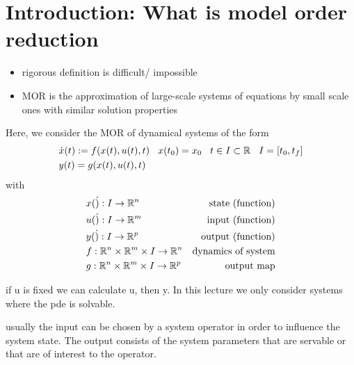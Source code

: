 
\chapter{Introduction: What is model order reduction}
\label{chap:introduction}

\begin{itemize}
	\item rigorous definition is difficult/ impossible
	\item MOR is the approximation of large-scale systems of equations by small scale ones with similar solution properties
\end{itemize}

Here, we consider the MOR of dynamical systems of the form
\begin{align*}
	& \dot{x}(t) : = f(x(t), u(t), t) \hspace{2ex} x(t_0)=x_0 \hspace{2ex} t \in I \subset \mathbb{R} \hspace{2ex} I=[t_0, t_f] \\
	& y(t)=g(x(t),u(t),t) 
\end{align*}
with 
\begin{align*}
	& x(\dot ) : I \rightarrow \mathbb{R}^n & \text{state (function)}\\
	& u(\dot ) : I \rightarrow \mathbb{R}^m & \text{input (function)}\\
	& y(\dot ) : I \rightarrow \mathbb{R}^p & \text{output (function)}\\
	& f : \mathbb{R}^n \times \mathbb{R}^m \times I  \rightarrow \mathbb{R}^n & \text{dynamics of system}\\
	& g: \mathbb{R}^n \times \mathbb{R}^m \times I \rightarrow \mathbb{R}^p & \text{output map}\\
\end{align*}

\begin{note}
	if u is fixed we can calculate u, then y. In this lecture we only consider systems where the pde is solvable. 
\end{note}

usually the input can be chosen by a system operator in order to influence the system state. The output consists of the system parameters that are servable or that are of interest to the operator.

